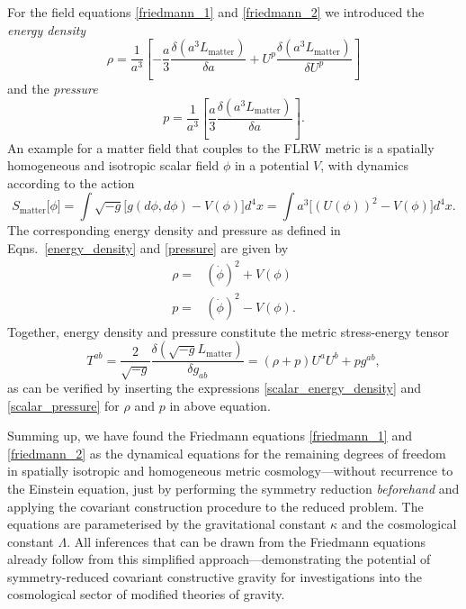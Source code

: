 For the field equations \eqref{friedmann_1} and \eqref{friedmann_2} we introduced the \emph{energy density}
\begin{equation}\label{energy_density}
  \rho = \frac{1}{a^3}\left\lbrack -\frac{a}{3} \frac{\delta(a^3 L_\text{matter})}{\delta a} + U^p \frac{\delta(a^3L_\text{matter})}{\delta U^p}\right\rbrack
\end{equation}
and the \emph{pressure}
\begin{equation}\label{pressure}
  p = \frac{1}{a^3} \left\lbrack \frac{a}{3} \frac{\delta(a^3L_\text{matter})}{\delta a}\right\rbrack.
\end{equation}
An example for a matter field that couples to the FLRW metric is a spatially homogeneous and isotropic scalar field $\phi$ in a potential $V$, with dynamics according to the action
\begin{equation}
  S_\text{matter}\lbrack\phi\rbrack = \int \sqrt{-g}\lbrack g(d\phi,d\phi) - V(\phi)\rbrack d^4x = \int a^3\lbrack (U(\phi))^2 - V(\phi)\rbrack d^4x.
\end{equation}
The corresponding energy density and pressure as defined in Eqns.~\eqref{energy_density} and \eqref{pressure} are given by
\begin{align}
  \rho = {} & (\dot\phi)^2 + V(\phi) \label{scalar_energy_density}\\
  p = {} & (\dot\phi)^2 - V(\phi) \label{scalar_pressure}.
\end{align}
Together, energy density and pressure constitute the metric stress-energy tensor
\begin{equation}
  T^{ab} = \frac{2}{\sqrt{-g}}\frac{\delta(\sqrt{-g}L_\text{matter})}{\delta g_{ab}} = (\rho + p)U^aU^b + pg^{ab},
\end{equation}
as can be verified by inserting the expressions \eqref{scalar_energy_density} and \eqref{scalar_pressure} for $\rho$ and $p$ in above equation.

Summing up, we have found the Friedmann equations \eqref{friedmann_1} and \eqref{friedmann_2} as the dynamical equations for the remaining degrees of freedom in spatially isotropic and homogeneous metric cosmology---without recurrence to the Einstein equation, just by performing the symmetry reduction \emph{beforehand} and applying the covariant construction procedure to the reduced problem. The equations are parameterised by the gravitational constant $\kappa$ and the cosmological constant $\Lambda$. All inferences that can be drawn from the Friedmann equations already follow from this simplified approach---demonstrating the potential of symmetry-reduced covariant constructive gravity for investigations into the cosmological sector of modified theories of gravity.

